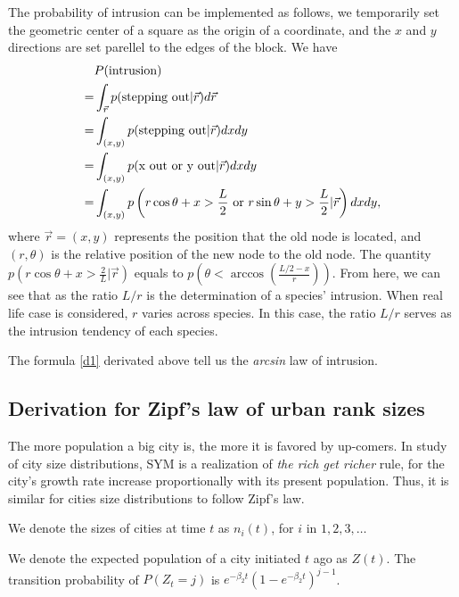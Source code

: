 \documentclass[aps,prl]{revtex4-1}
\begin{document}
The probability of intrusion can be implemented as follows, we temporarily set the geometric center of a square as the origin of a coordinate, and the $x$ and $y$ directions are set parellel to the edges of the block. We have 
\begin{align}
&P(\text{intrusion}) \\=& \int_{\vec{r}} p(\text{stepping out}|\vec{r})d\vec{r}\label{d1}\\
=& \int_{(x,y)} p(\text{stepping out}|\vec{r})dxdy    \notag \\
=& \int_{(x,y)}p(\text{x out or y out}|\vec{r})dxdy\notag
\\
=& \int_{(x,y)}p\left(r\cos\theta+x>\frac{L}{2}\text{ or }r\sin\theta+y>\frac{L}{2}|\vec{r}\right)dxdy,
\end{align}
where $\vec{r}=(x,y)$ represents the position that the old node is located, and $(r,\theta)$ is the relative position of the new node to the old node. The quantity $p\left(r\cos\theta+x>\frac{2}{L}|\vec{r}\right)$ equals to $p\left(\theta<\arccos\left(\frac{L/2-x}{r}\right)\right)$. From here, we can see that as the ratio $L/r$ is the determination of a species' intrusion. When  real life case is considered, $r$ varies across species. In this case, the ratio $L/r$ serves as the intrusion tendency of each species. 

The formula \ref{d1} derivated above tell us the \emph{arcsin} law of intrusion.

\subsection{Derivation for Zipf's law of urban rank sizes}

The more population a big city is, the more it is favored by up-comers. In study of city size distributions, SYM is a realization of \emph{the rich get richer} rule, for the city's growth rate increase proportionally with its present population. Thus, it is similar for cities size distributions to follow Zipf's law. 

We denote the sizes of cities at time $t$ as $n_i(t)$, for $i$ in $1,2,3,\dots$

We denote the expected population of a city initiated $t$ ago as $Z(t)$. The transition probability of $P(Z_t = j)$ is $e^{-\beta_2 t}(1-e^{-\beta_2 t})^{j-1}$. 
\end{document}
